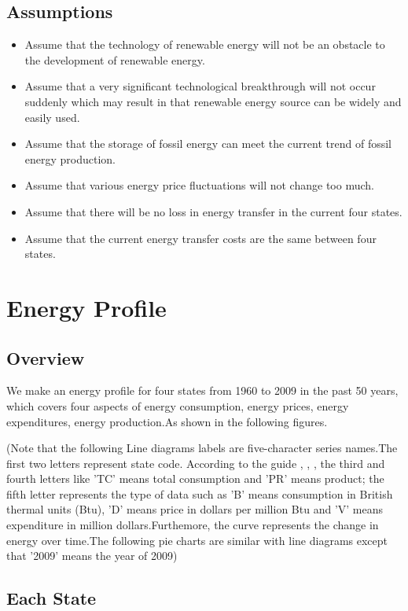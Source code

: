 \documentclass{mcmthesis}
\begin{document}
\subsection{Assumptions}
\begin{itemize}
  \item Assume that the technology of renewable energy will not be an obstacle to the development of renewable energy.
  \item Assume that a very significant technological breakthrough will not occur suddenly which may result in that renewable energy source can be widely and easily used.
  \item Assume that the storage of fossil energy can meet the current trend of fossil energy production.
  \item Assume that various energy price fluctuations will not change too much.
  \item Assume that there will be no loss in energy transfer in the current four states.
  \item Assume that the current energy transfer costs are the same between four states.
\end{itemize}
\section{Energy Profile}
\subsection{Overview}
We make an energy profile for four states from 1960 to 2009 in the past 50 years, which covers four aspects of energy consumption, energy prices, energy expenditures, energy production.As shown in the following figures.

(Note that the following Line diagrams labels are five-character series names.The first two letters  represent state code. According to the guide \cite{pr_guide}, \cite{use_guide}, \cite{product}, the third and fourth letters like 'TC' means total consumption and 'PR' means product; the fifth letter represents the type of data such as 'B' means consumption in British thermal units (Btu), 'D' means price in dollars per million Btu and 'V' means expenditure in million dollars.Furthemore, the curve represents the change in energy over time.The following pie charts are similar with line diagrams except that '2009' means the year of 2009) 

\subsection{Each State}
\end{document}
